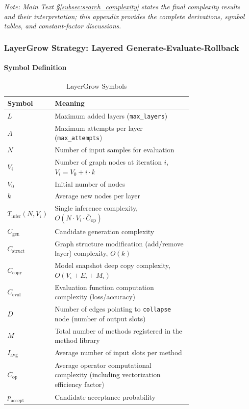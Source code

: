 \textit{Note: Main Text \S\ref{subsec:search_complexity} states the final complexity results and their interpretation; this appendix provides the complete derivations, symbol tables, and constant-factor discussions.}

\subsubsection{LayerGrow Strategy: Layered Generate-Evaluate-Rollback}

\paragraph{Symbol Definition}
\begin{table}[htbp]
    \centering
    \caption{LayerGrow Symbols}
    \label{tab:symbols_lg}
    \begin{tabular}{lp{0.75\linewidth}}
        \toprule
        \textbf{Symbol} & \textbf{Meaning} \\
        \midrule
        $L$ & Maximum added layers (\texttt{max\_layers}) \\
        $A$ & Maximum attempts per layer (\texttt{max\_attempts}) \\
        $N$ & Number of input samples for evaluation \\
        $V_i$ & Number of graph nodes at iteration $i$, $V_i = V_0 + i \cdot k$ \\
        $V_0$ & Initial number of nodes \\
        $k$ & Average new nodes per layer \\
        $T_{\mathrm{infer}}(N, V_i)$ & Single inference complexity, $O(N \cdot V_i \cdot \bar{C}_{\mathrm{op}})$ \\
        $C_{\mathrm{gen}}$ & Candidate generation complexity \\
        $C_{\mathrm{struct}}$ & Graph structure modification (add/remove layer) complexity, $O(k)$ \\
        $C_{\mathrm{copy}}$ & Model snapshot deep copy complexity, $O(V_i + E_i + M_i)$ \\
        $C_{\mathrm{eval}}$ & Evaluation function computation complexity (loss/accuracy) \\
        $D$ & Number of edges pointing to \texttt{collapse} node (number of output slots) \\
        $M$ & Total number of methods registered in the method library \\
        $I_{\mathrm{avg}}$ & Average number of input slots per method \\
        $\bar{C}_{\mathrm{op}}$ & Average operator computational complexity (including vectorization efficiency factor) \\
        $p_{\mathrm{accept}}$ & Candidate acceptance probability \\
        \bottomrule
    \end{tabular}
\end{table}

